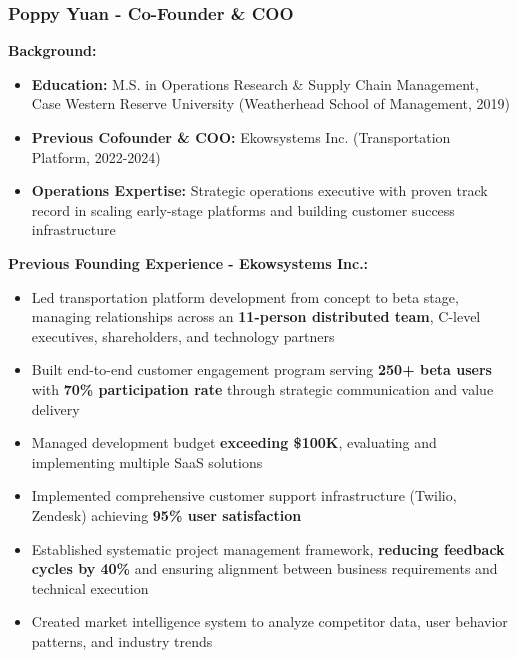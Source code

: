 \subsubsection{Poppy Yuan - Co-Founder \& COO}

\textbf{Background:}
\begin{itemize}[noitemsep]
    \item \textbf{Education:} M.S. in Operations Research \& Supply Chain Management, Case Western Reserve University (Weatherhead School of Management, 2019)
    \item \textbf{Previous Cofounder \& COO:} Ekowsystems Inc. (Transportation Platform, 2022-2024)
    \item \textbf{Operations Expertise:} Strategic operations executive with proven track record in scaling early-stage platforms and building customer success infrastructure
\end{itemize}

\textbf{Previous Founding Experience - Ekowsystems Inc.:}
\begin{itemize}[noitemsep]
    \item Led transportation platform development from concept to beta stage, managing relationships across an \textbf{11-person distributed team}, C-level executives, shareholders, and technology partners
    \item Built end-to-end customer engagement program serving \textbf{250+ beta users} with \textbf{70\% participation rate} through strategic communication and value delivery
    \item Managed development budget \textbf{exceeding \$100K}, evaluating and implementing multiple SaaS solutions
    \item Implemented comprehensive customer support infrastructure (Twilio, Zendesk) achieving \textbf{95\% user satisfaction}
    \item Established systematic project management framework, \textbf{reducing feedback cycles by 40\%} and ensuring alignment between business requirements and technical execution
    \item Created market intelligence system to analyze competitor data, user behavior patterns, and industry trends
\end{itemize}

